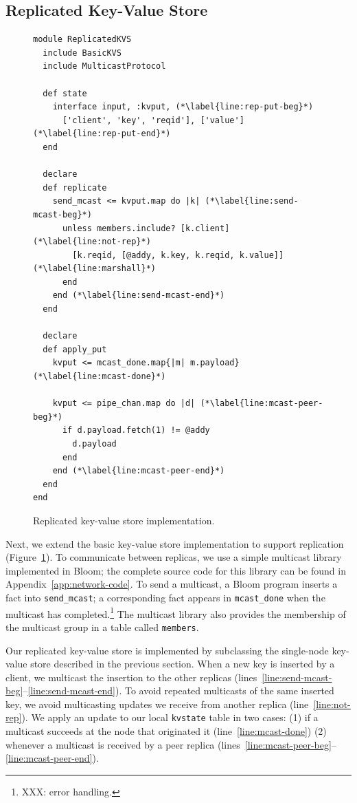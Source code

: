 \subsection{Replicated Key-Value Store}
\label{sec:rep-kvs}

\begin{figure}[t]
\begin{scriptsize}
\begin{lstlisting}
module ReplicatedKVS
  include BasicKVS
  include MulticastProtocol

  def state
    interface input, :kvput, (*\label{line:rep-put-beg}*)
      ['client', 'key', 'reqid'], ['value']  (*\label{line:rep-put-end}*)
  end

  declare
  def replicate
    send_mcast <= kvput.map do |k| (*\label{line:send-mcast-beg}*)
      unless members.include? [k.client]  (*\label{line:not-rep}*)
        [k.reqid, [@addy, k.key, k.reqid, k.value]]   (*\label{line:marshall}*)            
      end
    end (*\label{line:send-mcast-end}*)
  end

  declare
  def apply_put
    kvput <= mcast_done.map{|m| m.payload}  (*\label{line:mcast-done}*)

    kvput <= pipe_chan.map do |d| (*\label{line:mcast-peer-beg}*)
      if d.payload.fetch(1) != @addy
        d.payload
      end
    end (*\label{line:mcast-peer-end}*)
  end
end
\end{lstlisting}
\vspace{-10pt}
\caption{Replicated key-value store implementation.}
\label{fig:kvs-repl}
\end{scriptsize}
\vspace{-2pt}
\end{figure}

Next, we extend the basic key-value store implementation to support replication
(Figure~\ref{fig:kvs-repl}). To communicate between replicas, we use a simple
multicast library implemented in Bloom; the complete source code for this
library can be found in Appendix~\ref{app:network-code}. To send a multicast, a
Bloom program inserts a fact into \texttt{send\_mcast}; a corresponding fact
appears in \texttt{mcast\_done} when the multicast has completed.\footnote{XXX:
  error handling.} The multicast library also provides the membership of the
multicast group in a table called \texttt{members}.

Our replicated key-value store is implemented by subclassing the single-node
key-value store described in the previous section. When a new key is inserted by
a client, we multicast the insertion to the other replicas
(lines~\ref{line:send-mcast-beg}--\ref{line:send-mcast-end}). To avoid repeated
multicasts of the same inserted key, we avoid multicasting updates we receive
from another replica (line~\ref{line:not-rep}). We apply an update to our local
\texttt{kvstate} table in two cases: (1) if a multicast succeeds at the node
that originated it (line~\ref{line:mcast-done}) (2) whenever a multicast is
received by a peer replica
(lines~\ref{line:mcast-peer-beg}--\ref{line:mcast-peer-end}).

